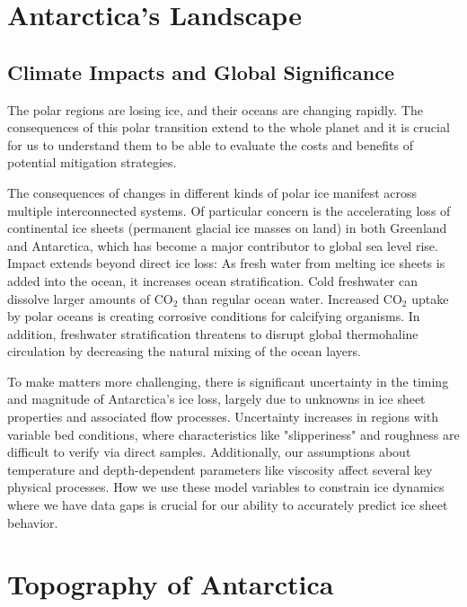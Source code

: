 \chapter{Antarctica's Landscape}\label{why}
\section*{Climate Impacts and Global Significance}

The polar regions are losing ice, and their oceans are changing rapidly\cite{O_C_in_changingClimate}. The consequences of this polar transition extend to the whole planet and it is crucial for us to understand them to be able to evaluate the costs and benefits of potential mitigation strategies. 

The consequences of changes in different kinds of polar ice manifest across multiple interconnected systems. Of particular concern is the accelerating loss of continental ice sheets (permanent glacial ice masses on land) in both Greenland and Antarctica, which has become a major contributor to global sea level rise\cite{O_C_in_changingClimate}. Impact extends beyond direct ice loss: As fresh water from melting ice sheets is added into the ocean, it increases ocean stratification. Cold freshwater can dissolve larger amounts of $\mathrm{CO_2}$ than regular ocean water. Increased $\mathrm{CO_2}$ uptake by polar oceans is creating corrosive conditions for calcifying organisms\cite{O_C_in_changingClimate}. In addition, freshwater stratification threatens to disrupt global thermohaline circulation\cite{Jacobs_2004} by decreasing the natural mixing of the ocean layers.
 
To make matters more challenging, there is significant uncertainty in the timing and magnitude of Antarctica's ice loss, largely due to unknowns in ice sheet properties and associated flow processes\cite{IPCC}. Uncertainty increases in regions with variable bed conditions, where characteristics like "slipperiness" and roughness are difficult to verify via direct samples. Additionally, our assumptions about temperature and depth-dependent parameters like viscosity affect several key physical processes. How we use these model variables to constrain ice dynamics where we have data gaps is crucial for our ability to accurately predict ice sheet behavior\cite{Ockenden_2022}.

\chapter{Topography of Antarctica}\label{review}

